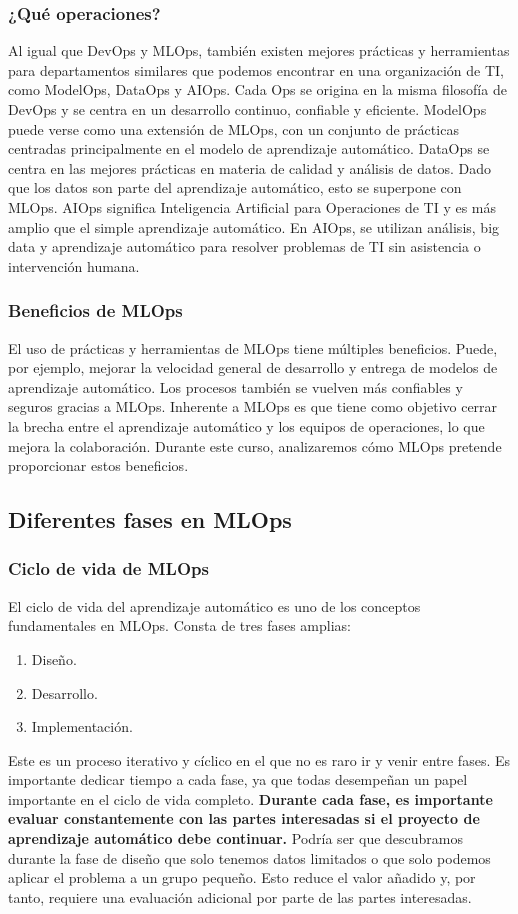 \documentclass[10pt]{book}
\begin{document}
\subsubsection{¿Qué operaciones?}
Al igual que DevOps y MLOps, también existen mejores prácticas y herramientas para departamentos similares que podemos encontrar en una organización de TI, como ModelOps, DataOps y AIOps. Cada Ops se origina en la misma filosofía de DevOps y se centra en un desarrollo continuo, confiable y eficiente. ModelOps puede verse como una extensión de MLOps, con un conjunto de prácticas centradas principalmente en el modelo de aprendizaje automático. DataOps se centra en las mejores prácticas en materia de calidad y análisis de datos. Dado que los datos son parte del aprendizaje automático, esto se superpone con MLOps. AIOps significa Inteligencia Artificial para Operaciones de TI y es más amplio que el simple aprendizaje automático. En AIOps, se utilizan análisis, big data y aprendizaje automático para resolver problemas de TI sin asistencia o intervención humana.

\subsubsection{Beneficios de MLOps}
El uso de prácticas y herramientas de MLOps tiene múltiples beneficios. Puede, por ejemplo, mejorar la velocidad general de desarrollo y entrega de modelos de aprendizaje automático. Los procesos también se vuelven más confiables y seguros gracias a MLOps. Inherente a MLOps es que tiene como objetivo cerrar la brecha entre el aprendizaje automático y los equipos de operaciones, lo que mejora la colaboración. Durante este curso, analizaremos cómo MLOps pretende proporcionar estos beneficios.

\subsection{Diferentes fases en MLOps}


\subsubsection{Ciclo de vida de MLOps}

El ciclo de vida del aprendizaje automático es uno de los conceptos fundamentales en MLOps. Consta de tres fases amplias: 
\begin{enumerate}
	\item Diseño.
	\item Desarrollo.
	\item Implementación.
\end{enumerate}
Este es un proceso iterativo y cíclico en el que no es raro ir y venir entre fases. Es importante dedicar tiempo a cada fase, ya que todas desempeñan un papel importante en el ciclo de vida completo. \textbf{Durante cada fase, es importante evaluar constantemente con las partes interesadas si el proyecto de aprendizaje automático debe continuar.} Podría ser que descubramos durante la fase de diseño que solo tenemos datos limitados o que solo podemos aplicar el problema a un grupo pequeño. Esto reduce el valor añadido y, por tanto, requiere una evaluación adicional por parte de las partes interesadas.
\end{document}
